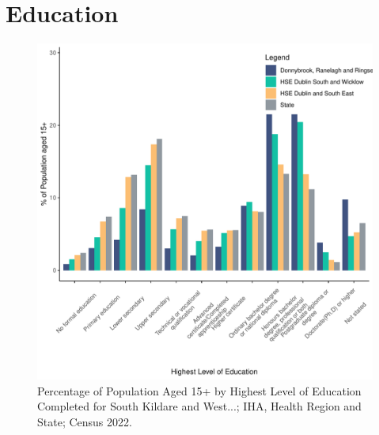 \documentclass{article}
\begin{document}
\section{Education}\label{sect:Edu}
\begin{figure}[H]
	\centering
	\includegraphics[width = 120mm]{../figures/EduED.pdf}
	\caption{Percentage of Population Aged 15+ by Highest Level of Education Completed for South Kildare and West...; IHA, Health Region and State; Census 2022.}
	\label{fig:vbnv}
	\end{figure}
\end{document}
